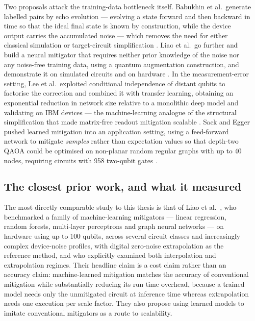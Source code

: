 \documentclass[Thesis.tex]{subfiles}
\begin{document}
Two proposals attack the training-data bottleneck itself. Babukhin et al.\
generate labelled pairs by echo evolution --- evolving a state forward and then
backward in time so that the ideal final state is known by construction, while
the device output carries the accumulated noise --- which removes the need for
either classical simulation or target-circuit simplification
\cite{babukhin2024echo}. Liao et al.\ go further and build a neural mitigator
that requires neither prior knowledge of the noise nor any noise-free training
data, using a quantum augmentation construction, and demonstrate it on
simulated circuits and on hardware \cite{liao2025noiseagnostic}. In the
measurement-error setting, Lee et al.\ exploited conditional independence of
distant qubits to factorise the correction and combined it with transfer
learning, obtaining an exponential reduction in network size relative to a
monolithic deep model and validating on IBM devices
\cite{lee2023scalable} --- the machine-learning analogue of the structural
simplification that made matrix-free readout mitigation scalable
\cite{nation2021scalable}. Sack and Egger pushed learned mitigation into an
application setting, using a feed-forward network to mitigate \emph{samples}
rather than expectation values so that depth-two QAOA could be optimised on
non-planar random regular graphs with up to 40 nodes, requiring circuits with
958 two-qubit gates \cite{sack2024large}.

\subsection{The closest prior work, and what it measured}

The most directly comparable study to this thesis is that of Liao et al.\
\cite{liao2024machine}, who benchmarked a family of machine-learning
mitigators --- linear regression, random forests, multi-layer perceptrons and
graph neural networks --- on hardware using up to 100 qubits, across several
circuit classes and increasingly complex device-noise profiles, with digital
zero-noise extrapolation as the reference method, and who explicitly examined
both interpolation and extrapolation regimes. Their headline claim is a cost
claim rather than an accuracy claim: machine-learned mitigation matches the
accuracy of conventional mitigation while substantially reducing its run-time
overhead, because a trained model needs only the unmitigated circuit at
inference time whereas extrapolation needs one execution per scale factor.
They also propose using learned models to imitate conventional mitigators as a
route to scalability.
\end{document}
